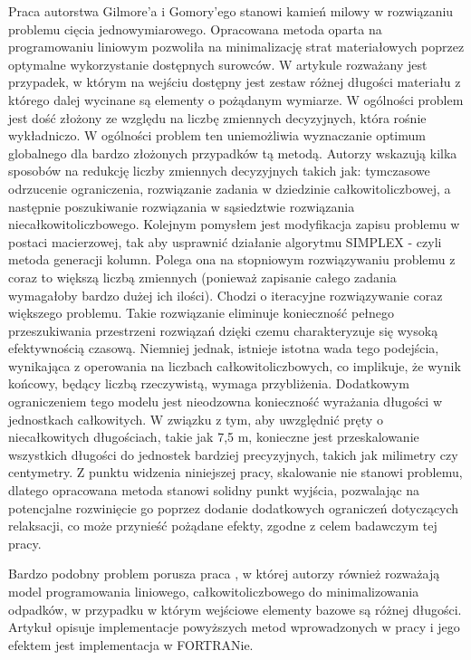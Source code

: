 Praca autorstwa Gilmore'a i Gomory'ego stanowi \cite{linear-programming-gilmore} kamień milowy w rozwiązaniu problemu cięcia jednowymiarowego. Opracowana metoda oparta na programowaniu liniowym pozwoliła na minimalizację strat materiałowych poprzez optymalne wykorzystanie dostępnych surowców. W artykule rozważany jest przypadek, w którym na wejściu dostępny jest zestaw różnej długości materiału z którego dalej wycinane są elementy o pożądanym wymiarze. W ogólności problem jest dość złożony ze względu na liczbę zmiennych decyzyjnych, która rośnie wykładniczo. W ogólności problem ten uniemożliwia wyznaczanie optimum globalnego dla bardzo złożonych przypadków tą metodą. Autorzy wskazują kilka sposobów na redukcję liczby zmiennych decyzyjnych takich jak: tymczasowe odrzucenie ograniczenia, rozwiązanie zadania w dziedzinie całkowitoliczbowej, a następnie poszukiwanie rozwiązania w sąsiedztwie rozwiązania niecałkowitoliczbowego. Kolejnym pomysłem jest modyfikacja zapisu problemu w postaci macierzowej, tak aby usprawnić działanie algorytmu SIMPLEX - czyli metoda generacji kolumn. Polega ona na stopniowym rozwiązywaniu problemu z coraz to większą liczbą zmiennych (ponieważ zapisanie całego zadania wymagałoby bardzo dużej ich ilości). Chodzi o iteracyjne rozwiązywanie coraz większego problemu. Takie rozwiązanie eliminuje konieczność pełnego przeszukiwania przestrzeni rozwiązań dzięki czemu charakteryzuje się wysoką efektywnością czasową. 
Niemniej jednak, istnieje istotna wada tego podejścia, wynikająca z operowania na liczbach całkowitoliczbowych, co implikuje, że wynik końcowy, będący liczbą rzeczywistą, wymaga przybliżenia. Dodatkowym ograniczeniem tego modelu jest nieodzowna konieczność wyrażania długości w jednostkach całkowitych. W związku z tym, aby uwzględnić pręty o niecałkowitych długościach, takie jak 7,5 m, konieczne jest przeskalowanie wszystkich długości do jednostek bardziej precyzyjnych, takich jak milimetry czy centymetry. Z punktu widzenia niniejszej pracy, skalowanie nie stanowi problemu, dlatego opracowana metoda stanowi solidny punkt wyjścia, pozwalając na potencjalne rozwinięcie go poprzez dodanie dodatkowych ograniczeń dotyczących relaksacji, co może przynieść pożądane efekty, zgodne z celem badawczym tej pracy.

Bardzo podobny problem porusza praca \cite{optimization-cloth}, w której autorzy również rozważają model programowania liniowego, całkowitoliczbowego do minimalizowania odpadków, w przypadku w którym wejściowe elementy bazowe są różnej długości. Artykuł opisuje implementacje powyższych metod wprowadzonych w pracy \cite{linear-programming-gilmore} i jego efektem jest implementacja w FORTRANie.

